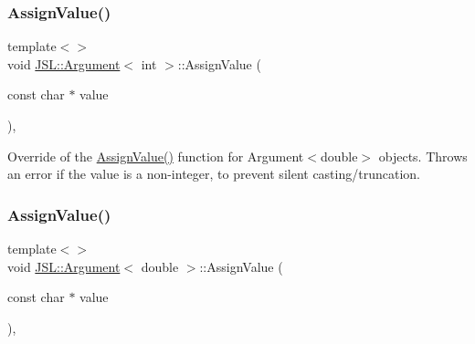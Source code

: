 \mbox{\label{classJSL_1_1Argument_a6e8fe8e7cca2aeffe23f6fbadb88d4c8}} 
\subsubsection{\texorpdfstring{Assign\+Value()}{AssignValue()}\hspace{0.1cm}{\footnotesize\ttfamily [2/5]}}
{\footnotesize\ttfamily template$<$$>$ \\
void \hyperlink{classJSL_1_1Argument}{J\+S\+L\+::\+Argument}$<$ int $>$\+::Assign\+Value (\begin{DoxyParamCaption}\item[{const char $\ast$}]{value }\end{DoxyParamCaption})\hspace{0.3cm}{\ttfamily [inline]}, {\ttfamily [private]}}



Override of the \hyperlink{classJSL_1_1Argument_ac77530598054943c996dbb5fb677b844}{Assign\+Value()} function for Argument$<$double$>$ objects. Throws an error if the value is a non-\/integer, to prevent silent casting/truncation. 

\mbox{\label{classJSL_1_1Argument_a059e7c6f1d9232a93cf725510fe2db27}} 
\subsubsection{\texorpdfstring{Assign\+Value()}{AssignValue()}\hspace{0.1cm}{\footnotesize\ttfamily [3/5]}}
{\footnotesize\ttfamily template$<$$>$ \\
void \hyperlink{classJSL_1_1Argument}{J\+S\+L\+::\+Argument}$<$ double $>$\+::Assign\+Value (\begin{DoxyParamCaption}\item[{const char $\ast$}]{value }\end{DoxyParamCaption})\hspace{0.3cm}{\ttfamily [inline]}, {\ttfamily [private]}}



